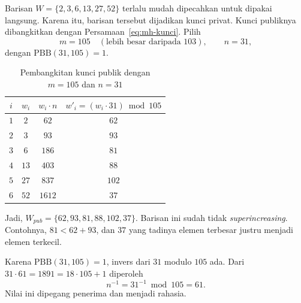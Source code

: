 \begin{example}
\label{ex:mh-kunci-105}
Barisan $W = \{2, 3, 6, 13, 27, 52\}$ terlalu mudah dipecahkan untuk dipakai
langsung. Karena itu, barisan tersebut dijadikan kunci privat. Kunci publiknya
dibangkitkan dengan Persamaan~\eqref{eq:mh-kunci}. Pilih
\[ m = 105 \quad (\text{lebih besar daripada } 103), \qquad n = 31 , \]
dengan $\text{PBB}(31, 105) = 1$.

\begin{table}[htbp]
    \centering
    \begin{tabular}{@{}c c c c@{}}
    \toprule
    $i$ & $w_i$ & $w_i \cdot n$ & $w'_i = (w_i \cdot 31) \bmod 105$ \\
    \midrule
    $1$ & $2$  & $62$   & $62$  \\
    $2$ & $3$  & $93$   & $93$  \\
    $3$ & $6$  & $186$  & $81$  \\
    $4$ & $13$ & $403$  & $88$  \\
    $5$ & $27$ & $837$  & $102$ \\
    $6$ & $52$ & $1612$ & $37$  \\
    \bottomrule
    \end{tabular}
    \caption{Pembangkitan kunci publik dengan $m = 105$ dan $n = 31$}
    \label{tab:mh-kunci-105}
\end{table}

Jadi, $W_{pub} = \{62, 93, 81, 88, 102, 37\}$. Barisan ini sudah tidak
\textit{superincreasing}. Contohnya, $81 < 62 + 93$, dan $37$ yang tadinya
elemen terbesar justru menjadi elemen terkecil.

Karena $\text{PBB}(31, 105) = 1$, invers dari $31$ modulo $105$ ada. Dari
$31 \cdot 61 = 1891 = 18 \cdot 105 + 1$ diperoleh
\[ n^{-1} = 31^{-1} \bmod 105 = 61 . \]
Nilai ini dipegang penerima dan menjadi rahasia.
\end{example}

